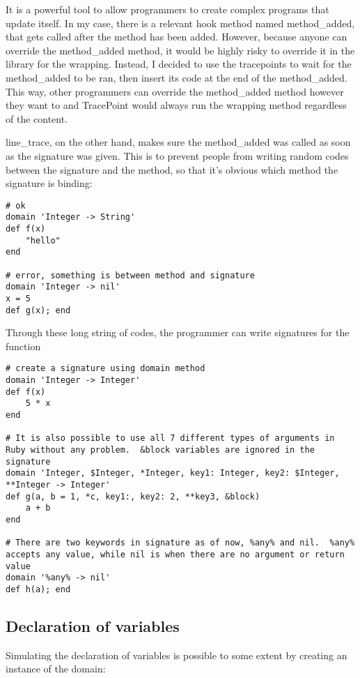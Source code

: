 It is a powerful tool to allow programmers to create complex programs that update itself.  In my case, there is a relevant hook method named method\_added, that gets called after the method has been added.  However, because anyone can override the method\_added method, it would be highly risky to override it in the library for the wrapping.  Instead, I decided to use the tracepoints to wait for the method\_added to be ran, then insert its code at the end of the method\_added.  This way, other programmers can override the method\_added method however they want to and TracePoint would always run the wrapping method regardless of the content.

line\_trace, on the other hand, makes sure the method\_added was called as soon as the signature was given.  This is to prevent people from writing random codes between the signature and the method, so that it's obvious which method the signature is binding:

\begin{lstlisting}[caption={Error example}]
# ok
domain 'Integer -> String'
def f(x)
    "hello"
end

# error, something is between method and signature
domain 'Integer -> nil'
x = 5
def g(x); end
\end{lstlisting}

Through these long string of codes, the programmer can write signatures for the function

\begin{lstlisting}[caption={Signature demo}]
# create a signature using domain method
domain 'Integer -> Integer'
def f(x)
    5 * x
end

# It is also possible to use all 7 different types of arguments in Ruby without any problem.  &block variables are ignored in the signature
domain 'Integer, $Integer, *Integer, key1: Integer, key2: $Integer, **Integer -> Integer'
def g(a, b = 1, *c, key1:, key2: 2, **key3, &block)
    a + b
end

# There are two keywords in signature as of now, %any% and nil.  %any% accepts any value, while nil is when there are no argument or return value
domain '%any% -> nil'
def h(a); end
\end{lstlisting}

\subsection{Declaration of variables}

Simulating the declaration of variables is possible to some extent by creating an instance of the domain:

